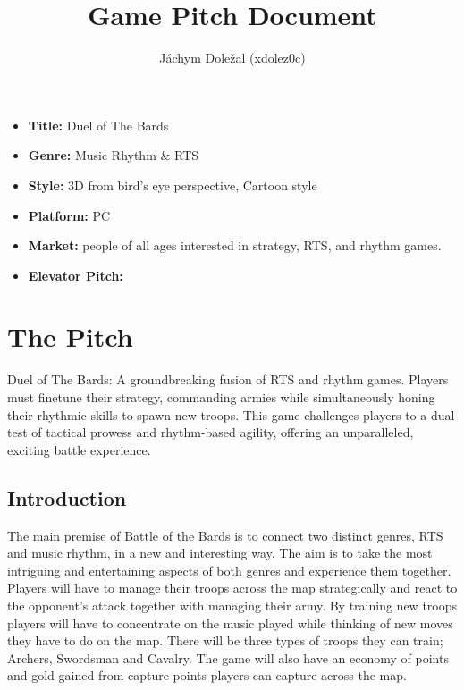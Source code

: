\documentclass[a4paper,10pt,english]{article}
\title{%
Game Pitch Document%
}
\author{%
Jáchym Doležal (xdolez0c)%
}
\date{}
\begin{document}
\maketitle
\thispagestyle{empty}

{%
\large

\begin{itemize}

\item[] \textbf{Title:} Duel of The Bards

\item[] \textbf{Genre:} Music Rhythm \& RTS

\item[] \textbf{Style:} 3D from bird's eye perspective, Cartoon style
\item[] \textbf{Platform:} PC 

\item[] \textbf{Market:} people of all ages interested in strategy, RTS, and rhythm games.

\item[] \textbf{Elevator Pitch:}

\end{itemize}

}

\section*{\centering The Pitch}

Duel of The Bards: A groundbreaking fusion of RTS and rhythm games. Players must finetune their strategy, commanding armies while simultaneously honing their rhythmic skills to spawn new troops. This game challenges players to a dual test of tactical prowess and rhythm-based agility, offering an unparalleled, exciting battle experience.

\subsection*{Introduction}

The main premise of Battle of the Bards is to connect two distinct genres, RTS and music rhythm, in a new and interesting way. The aim is to take the most intriguing and entertaining aspects of both genres and experience them together. Players will have to manage their troops across the map strategically and react to the opponent's attack together with managing their army. By training new troops players will have to concentrate on the music played while thinking of new moves they have to do on the map. There will be three types of troops they can train; Archers, Swordsman and Cavalry. The game will also have an economy of points and gold gained from capture points players can capture across the map. 
\end{document}
